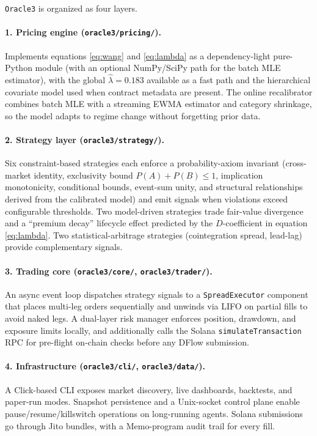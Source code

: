 \documentclass[11pt,a4paper]{article}
\begin{document}
\texttt{Oracle3} is organized as four layers.

\paragraph{1. Pricing engine (\texttt{oracle3/pricing/}).}
Implements equations \eqref{eq:wang} and \eqref{eq:lambda} as a
dependency-light pure-Python module (with an optional NumPy/SciPy path for the
batch MLE estimator), with the global $\hat\lambda = 0.183$ available as a
fast path and the hierarchical covariate model used when contract metadata
are present. The online recalibrator combines batch MLE with a streaming EWMA
estimator and category shrinkage, so the model adapts to regime change
without forgetting prior data.

\paragraph{2. Strategy layer (\texttt{oracle3/strategy/}).}
Six constraint-based strategies each enforce a probability-axiom invariant
(cross-market identity, exclusivity bound $P(A) + P(B) \le 1$, implication
monotonicity, conditional bounds, event-sum unity, and structural
relationships derived from the calibrated model) and emit signals when
violations exceed configurable thresholds. Two model-driven strategies trade
fair-value divergence and a ``premium decay'' lifecycle effect predicted by
the $D$-coefficient in equation \eqref{eq:lambda}. Two statistical-arbitrage
strategies (cointegration spread, lead-lag) provide complementary signals.

\paragraph{3. Trading core (\texttt{oracle3/core/}, \texttt{oracle3/trader/}).}
An async event loop dispatches strategy signals to a \texttt{SpreadExecutor}
component that places multi-leg orders sequentially and unwinds via LIFO on
partial fills to avoid naked legs. A dual-layer risk manager enforces position,
drawdown, and exposure limits locally, and additionally calls the Solana
\texttt{simulateTransaction} RPC for pre-flight on-chain checks before any
DFlow submission.

\paragraph{4. Infrastructure (\texttt{oracle3/cli/}, \texttt{oracle3/data/}).}
A Click-based CLI exposes market discovery, live dashboards, backtests, and
paper-run modes. Snapshot persistence and a Unix-socket control plane enable
pause/resume/killswitch operations on long-running agents. Solana submissions
go through Jito bundles, with a Memo-program audit trail for every fill.
\end{document}
